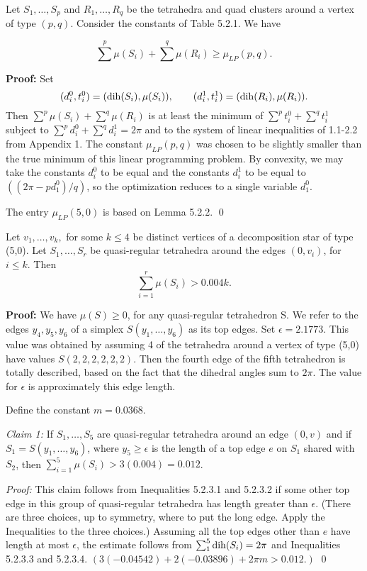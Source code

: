  Let $S_1,\dots,S_p$ and $R_1,\dots,R_q$ be the tetrahedra and quad clusters around a vertex of type $(p,q)$.  Consider the constants of Table 5.2.1.  We have 

$$\sum^p \mu (S_i) + \sum^q \mu (R_i) \geq \mu_{LP}(p,q).$$  \endproclaim

{\bf Proof:} Set 
$$(d_i^0,t_i^0)=(\operatorname{dih}(S_i),\mu(S_i)),\qquad 
(d_i^1,t_i^1)=(\operatorname{dih}(R_i),\mu(R_i)).$$  Then
$\sum^p\mu(S_i)+\sum^q\mu(R_i)$ is at least the minimum
of $\sum^p t_i^0+\sum^q t_i^1$ subject to
$\sum^p d_i^0+\sum^q d_i^1 = 2\pi$ and to the system
of linear inequalities of 1.1-2.2 from Appendix 1.
The constant $\mu_{LP}(p,q)$ was chosen to be slightly smaller
than the true minimum of this linear programming problem.  
By convexity, we may take the constants $d_i^0$ to be equal and
the constants $d_i^1$ to be equal to $((2\pi-pd_1^0)/q)$, so the
optimization reduces to a single variable $d_1^0$.

The entry $\mu_{LP}(5,0)$ is based on Lemma 5.2.2.  \qed


 Let $v_1,\dots,v_k,$ for some $k\leq 4$ be distinct vertices of a decomposition star of type (5,0).  Let $S_1,\dots,S_r$ be quasi-regular tetrahedra around the edges $(0,v_i)$, for $i\leq k$.  
Then $$\sum_{i=1}^r \mu(S_i)> 0.004 k.$$  \endproclaim

{\bf Proof:} We have $\mu(S)\geq 0$, for any quasi-regular tetrahedron S.  We refer to the edges $y_4,y_5,y_6$ of a simplex $S(y_1,\dots,y_6)$ as its top edges.  Set $\epsilon=2.1773$.  This value was obtained by assuming 4 of the tetrahedra around a vertex of type (5,0) have values $S(2,2,2,2,2,2)$.  Then the fourth edge of the  fifth tetrahedron is totally described, based on the fact that the dihedral angles sum to $2 \pi$.  The value for  $\epsilon$ is approximately this edge length.

Define the constant $m=0.0368$.


{\it Claim 1:}  If $S_1,\dots, S_5$ are quasi-regular tetrahedra around an edge $(0,v)$ and if $S_1=S(y_1,\dots,y_6)$, where $y_5\geq \epsilon$ is the length of a top edge $e$ on $S_1$ shared with $S_2$, then 
$\sum_{i=1}^5 \mu(S_i) > 3 (0.004)=0.012$.  

{\it Proof:}  This claim follows from Inequalities 5.2.3.1 and 5.2.3.2 if some other top edge in this group of quasi-regular tetrahedra has length greater than $\epsilon$.  (There are three choices, up to symmetry, where to put the long edge.  Apply the Inequalities to the three choices.)
Assuming all the top edges other than $e$ have length at most $\epsilon$, the estimate follows from $\sum_1^5 \operatorname{dih}(S_i)=2 \pi$ and Inequalities 5.2.3.3 and 5.2.3.4. 
 $(3 (-0.04542) + 2 (-0.03896) + 2 \pi m > 0.012.)$
\qed

